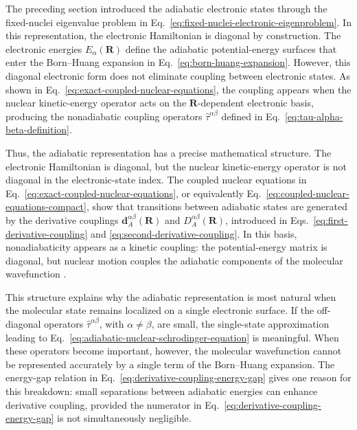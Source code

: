 \documentclass[
  11pt,
  letterpaper,
  onehalfspacing,
  normalmargins,
  equalmargins,
  oneside
]{ut-thesis}
\begin{document}
The preceding section introduced the adiabatic electronic states through the
fixed-nuclei eigenvalue problem in
Eq.~\eqref{eq:fixed-nuclei-electronic-eigenproblem}. In this representation,
the electronic Hamiltonian is diagonal by construction. The electronic
energies \(E_\alpha(\mathbf R)\) define the adiabatic potential-energy
surfaces that enter the Born--Huang expansion in
Eq.~\eqref{eq:born-huang-expansion}. However, this diagonal electronic form
does not eliminate coupling between electronic states. As shown in
Eq.~\eqref{eq:exact-coupled-nuclear-equations}, the coupling appears when the
nuclear kinetic-energy operator acts on the \(\mathbf R\)-dependent electronic
basis, producing the nonadiabatic coupling operators
\(\hat\tau^{\alpha\beta}\) defined in
Eq.~\eqref{eq:tau-alpha-beta-definition}.

Thus, the adiabatic representation has a precise mathematical structure. The
electronic Hamiltonian is diagonal, but the nuclear kinetic-energy operator is
not diagonal in the electronic-state index. The coupled nuclear equations in
Eq.~\eqref{eq:exact-coupled-nuclear-equations}, or equivalently
Eq.~\eqref{eq:coupled-nuclear-equations-compact}, show that transitions
between adiabatic states are generated by the derivative couplings
\(\mathbf d_A^{\alpha\beta}(\mathbf R)\) and
\(D_A^{\alpha\beta}(\mathbf R)\), introduced in
Eqs.~\eqref{eq:first-derivative-coupling} and
\eqref{eq:second-derivative-coupling}. In this basis, nonadiabaticity appears
as a kinetic coupling: the potential-energy matrix is diagonal, but nuclear
motion couples the adiabatic components of the molecular wavefunction
\cite{Baer2006Book}.

This structure explains why the adiabatic representation is most natural when
the molecular state remains localized on a single electronic surface. If the
off-diagonal operators \(\hat\tau^{\alpha\beta}\), with
\(\alpha\neq\beta\), are small, the single-state approximation leading to
Eq.~\eqref{eq:adiabatic-nuclear-schrodinger-equation} is meaningful. When
these operators become important, however, the molecular wavefunction cannot
be represented accurately by a single term of the Born--Huang expansion. The
energy-gap relation in Eq.~\eqref{eq:derivative-coupling-energy-gap} gives one
reason for this breakdown: small separations between adiabatic energies can
enhance derivative coupling, provided the numerator in
Eq.~\eqref{eq:derivative-coupling-energy-gap} is not simultaneously
negligible.
\end{document}
